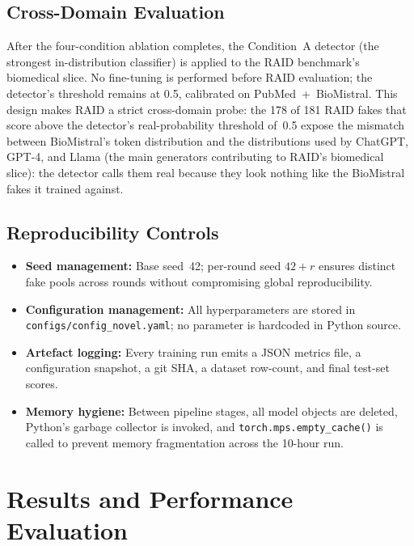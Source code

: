 \documentclass[12pt,a4paper]{article}
\begin{document}
\subsection{Cross-Domain Evaluation}

After the four-condition ablation completes, the Condition~A detector
(the strongest in-distribution classifier) is applied to the RAID
benchmark's biomedical slice. No fine-tuning is performed before RAID
evaluation; the detector's threshold remains at 0.5, calibrated on
PubMed~+~BioMistral. This design makes RAID a strict cross-domain probe:
the 178 of 181 RAID fakes that score above the detector's
real-probability threshold of~0.5 expose the mismatch between
BioMistral's token distribution and the distributions used by ChatGPT,
GPT-4, and Llama (the main generators contributing to RAID's biomedical
slice): the detector calls them real because they look nothing like the
BioMistral fakes it trained against.

\subsection{Reproducibility Controls}

\begin{itemize}
    \item \textbf{Seed management:} Base seed~42; per-round seed
          $42 + r$ ensures distinct fake pools across rounds without
          compromising global reproducibility.
    \item \textbf{Configuration management:} All hyperparameters are
          stored in \texttt{configs/config\_novel.yaml}; no parameter
          is hardcoded in Python source.
    \item \textbf{Artefact logging:} Every training run emits a JSON
          metrics file, a configuration snapshot, a git SHA, a dataset
          row-count, and final test-set scores.
    \item \textbf{Memory hygiene:} Between pipeline stages, all model
          objects are deleted, Python's garbage collector is invoked, and
          \texttt{torch.mps.empty\_cache()} is called to prevent memory
          fragmentation across the 10-hour run.
\end{itemize}

\newpage
\section{Results and Performance Evaluation}
\label{sec:results}
\end{document}
